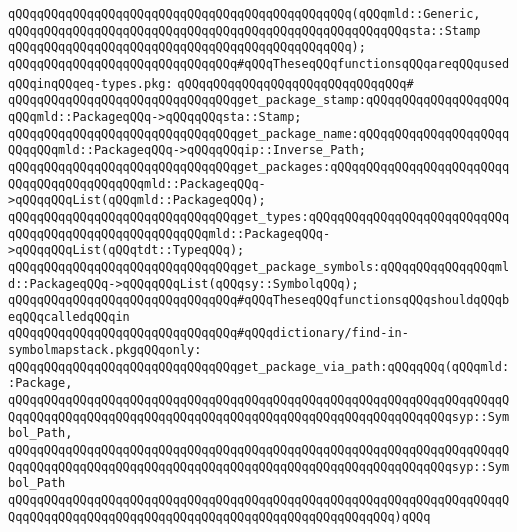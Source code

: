 \verb|qQQqqQQqqQQqqQQqqQQqqQQqqQQqqQQqqQQqqQQqqQQqqQQq(qQQqmld::Generic,|\newline
\verb|qQQqqQQqqQQqqQQqqQQqqQQqqQQqqQQqqQQqqQQqqQQqqQQqqQQqqQQqsta::Stamp|\newline
\verb|qQQqqQQqqQQqqQQqqQQqqQQqqQQqqQQqqQQqqQQqqQQqqQQq);|\newline
\newline
\verb|qQQqqQQqqQQqqQQqqQQqqQQqqQQqqQQq#qQQqTheseqQQqfunctionsqQQqareqQQqusedqQQqinqQQqeq-types.pkg:|\newline
\verb|qQQqqQQqqQQqqQQqqQQqqQQqqQQqqQQq#|\newline
\verb|qQQqqQQqqQQqqQQqqQQqqQQqqQQqqQQqget_package_stamp:qQQqqQQqqQQqqQQqqQQqqQQqmld::PackageqQQq->qQQqqQQqsta::Stamp;|\newline
\verb|qQQqqQQqqQQqqQQqqQQqqQQqqQQqqQQqget_package_name:qQQqqQQqqQQqqQQqqQQqqQQqqQQqmld::PackageqQQq->qQQqqQQqip::Inverse_Path;|\newline
\verb|qQQqqQQqqQQqqQQqqQQqqQQqqQQqqQQqget_packages:qQQqqQQqqQQqqQQqqQQqqQQqqQQqqQQqqQQqqQQqqQQqmld::PackageqQQq->qQQqqQQqList(qQQqmld::PackageqQQq);|\newline
\verb|qQQqqQQqqQQqqQQqqQQqqQQqqQQqqQQqget_types:qQQqqQQqqQQqqQQqqQQqqQQqqQQqqQQqqQQqqQQqqQQqqQQqqQQqqQQqmld::PackageqQQq->qQQqqQQqList(qQQqtdt::TypeqQQq);|\newline
\verb|qQQqqQQqqQQqqQQqqQQqqQQqqQQqqQQqget_package_symbols:qQQqqQQqqQQqqQQqmld::PackageqQQq->qQQqqQQqList(qQQqsy::SymbolqQQq);|\newline
\newline
\newline
\newline
\verb|qQQqqQQqqQQqqQQqqQQqqQQqqQQqqQQq#qQQqTheseqQQqfunctionsqQQqshouldqQQqbeqQQqcalledqQQqin|\newline
\verb|qQQqqQQqqQQqqQQqqQQqqQQqqQQqqQQq#qQQqdictionary/find-in-symbolmapstack.pkgqQQqonly:|\newline
\newline
\verb|qQQqqQQqqQQqqQQqqQQqqQQqqQQqqQQqget_package_via_path:qQQqqQQq(qQQqmld::Package,|\newline
\verb|qQQqqQQqqQQqqQQqqQQqqQQqqQQqqQQqqQQqqQQqqQQqqQQqqQQqqQQqqQQqqQQqqQQqqQQqqQQqqQQqqQQqqQQqqQQqqQQqqQQqqQQqqQQqqQQqqQQqqQQqqQQqqQQqqQQqsyp::Symbol_Path,|\newline
\verb|qQQqqQQqqQQqqQQqqQQqqQQqqQQqqQQqqQQqqQQqqQQqqQQqqQQqqQQqqQQqqQQqqQQqqQQqqQQqqQQqqQQqqQQqqQQqqQQqqQQqqQQqqQQqqQQqqQQqqQQqqQQqqQQqqQQqsyp::Symbol_Path|\newline
\verb|qQQqqQQqqQQqqQQqqQQqqQQqqQQqqQQqqQQqqQQqqQQqqQQqqQQqqQQqqQQqqQQqqQQqqQQqqQQqqQQqqQQqqQQqqQQqqQQqqQQqqQQqqQQqqQQqqQQqqQQqqQQq)qQQq|\newline
